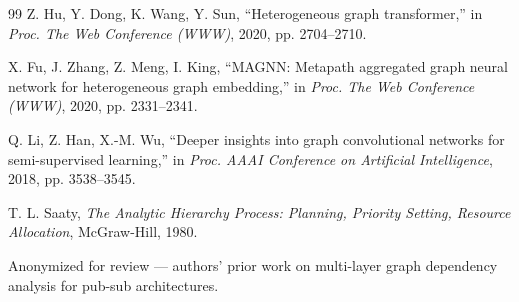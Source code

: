 \documentclass[review]{elsarticle}
\begin{document}
\begin{thebibliography}{99}
 Z. Hu, Y. Dong, K. Wang, Y. Sun, ``Heterogeneous graph transformer,'' in
\emph{Proc. The Web Conference (WWW)}, 2020, pp. 2704--2710.

 X. Fu, J. Zhang, Z. Meng, I. King, ``MAGNN: Metapath aggregated graph neural
network for heterogeneous graph embedding,'' in \emph{Proc. The Web Conference (WWW)}, 2020, pp.
2331--2341.

 Q. Li, Z. Han, X.-M. Wu, ``Deeper insights into graph convolutional
networks for semi-supervised learning,'' in \emph{Proc. AAAI Conference on Artificial Intelligence},
2018, pp. 3538--3545.

 T. L. Saaty, \emph{The Analytic Hierarchy Process: Planning, Priority Setting,
Resource Allocation}, McGraw-Hill, 1980.

 Anonymized for review --- authors' prior work on multi-layer graph dependency
analysis for pub-sub architectures.

\end{thebibliography}
\end{document}

